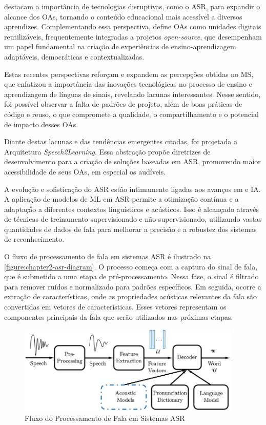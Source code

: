  destacam a importância de tecnologias disruptivas, como o ASR, para expandir o alcance dos OAs, tornando o conteúdo educacional mais acessível a diversos aprendizes. Complementando essa perspectiva,  define OAs como unidades digitais reutilizáveis, frequentemente integradas a projetos \textit{open-source}, que desempenham um papel fundamental na criação de experiências de ensino-aprendizagem adaptáveis, democráticas e contextualizadas.

Estas recentes perspectivas reforçam e expandem as percepções obtidas no MS, que enfatizou a importância das inovações tecnológicas no processo de ensino e aprendizagem de línguas de sinais, revelando lacunas interessantes. Nesse sentido, foi possível observar a falta de padrões de projeto, além de boas práticas de código e reuso, o que compromete a qualidade, o compartilhamento e o potencial de impacto desses OAs.

Diante destas lacunas e das tendências emergentes citadas, foi projetada a Arquitetura \textit{Speech2Learning}. Essa abstração propõe diretrizes de desenvolvimento para a criação de soluções baseadas em ASR, promovendo maior acessibilidade de seus OAs, em especial os audíveis.

A evolução e sofisticação do ASR estão intimamente ligadas aos avanços em  e IA. A aplicação de modelos de ML em ASR permite a otimização contínua e a adaptação a diferentes contextos linguísticos e acústicos. Isso é alcançado através de técnicas de treinamento supervisionado e não supervisionado, utilizando vastas quantidades de dados de fala para melhorar a precisão e a robustez dos sistemas de reconhecimento.

O fluxo de processamento de fala em sistemas ASR é ilustrado na \autoref{figure:chapter2-asr-diagram}. O processo começa com a captura do sinal de fala, que é submetido a uma etapa de pré-processamento. Nessa fase, o sinal é filtrado para remover ruídos e normalizado para padrões específicos. Em seguida, ocorre a extração de características, onde as propriedades acústicas relevantes da fala são convertidas em vetores de características. Esses vetores representam os componentes principais da fala que serão utilizados nas próximas etapas.

\begin{figure}[htb]
\centering
\caption{Fluxo do Processamento de Fala em Sistemas ASR}
\label{figure:chapter2-asr-diagram}
\includegraphics[width=0.95\textwidth]{images/chapter2-asr-diagram.png}
\end{figure}

